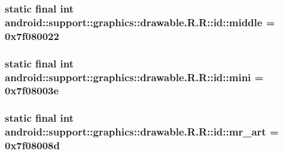 \hypertarget{classandroid_1_1support_1_1graphics_1_1drawable_1_1_r_1_1id_d2113897f693cc1fa9da5dbb0dd930e1}{
\subsubsection[{middle}]{\setlength{\rightskip}{0pt plus 5cm}static final int android::support::graphics::drawable.R.R::id::middle = 0x7f080022}}
\label{classandroid_1_1support_1_1graphics_1_1drawable_1_1_r_1_1id_d2113897f693cc1fa9da5dbb0dd930e1}


\hypertarget{classandroid_1_1support_1_1graphics_1_1drawable_1_1_r_1_1id_acc255597917e148e344940b41f5b6bb}{
\subsubsection[{mini}]{\setlength{\rightskip}{0pt plus 5cm}static final int android::support::graphics::drawable.R.R::id::mini = 0x7f08003e}}
\label{classandroid_1_1support_1_1graphics_1_1drawable_1_1_r_1_1id_acc255597917e148e344940b41f5b6bb}


\hypertarget{classandroid_1_1support_1_1graphics_1_1drawable_1_1_r_1_1id_bcf93eabfad774f2d0e220797aeea197}{
\subsubsection[{mr\_\-art}]{\setlength{\rightskip}{0pt plus 5cm}static final int android::support::graphics::drawable.R.R::id::mr\_\-art = 0x7f08008d}}
\label{classandroid_1_1support_1_1graphics_1_1drawable_1_1_r_1_1id_bcf93eabfad774f2d0e220797aeea197}


